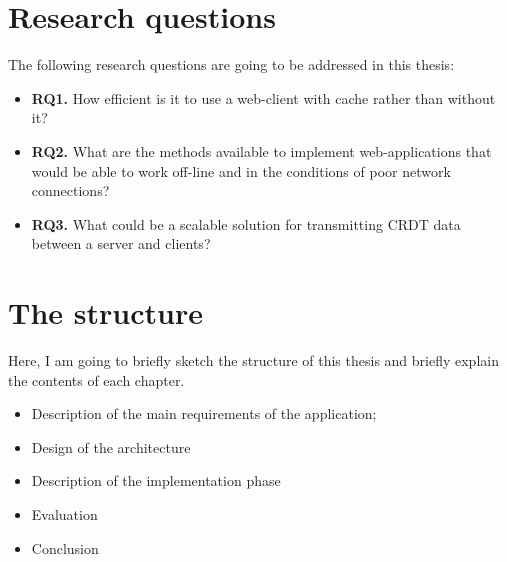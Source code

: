 \section{Research questions}

The following research questions are going to be addressed in this thesis:

\begin{itemize}
    \item \textbf{RQ1.} How efficient is it to use a web-client with cache rather than without it?
    \item \textbf{RQ2.} What are the methods available to implement web-applications that would be able to work off-line and
    in the conditions of poor network connections?
    \item \textbf{RQ3.} What could be a scalable solution for transmitting CRDT data between a server and clients?
  \end{itemize}





\section{The structure}

Here, I am going to briefly sketch the structure of this thesis and briefly explain the contents of each chapter. 

\begin{itemize}
    \item Description of the main requirements of the application;
    \item Design of the architecture 
    \item Description of the implementation phase
    \item Evaluation
    \item Conclusion
  \end{itemize}